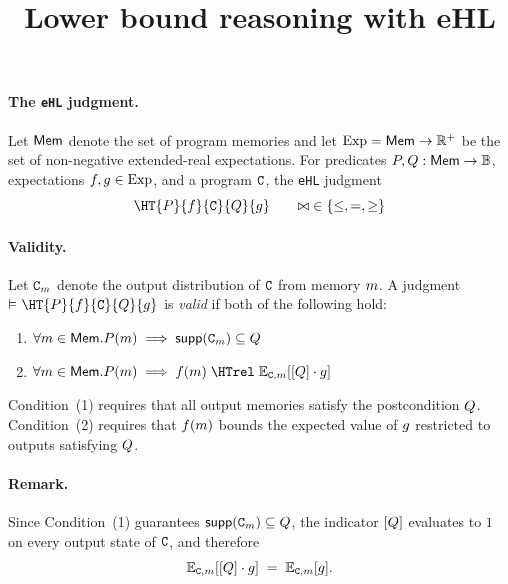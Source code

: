 \documentclass[acmsmall,natbib,review,screen,anonymous,10pt]{acmart}
\newcommand*{\EHL}{\texttt{eHL}\xspace} %
\begin{document}
\newcommand{\todo}[2][red]{{\ttfamily\color{#1}[#2]}}
\newcommand{\ma}[1]{\todo[red]{MA: #1}}

\title{Lower bound reasoning with \textsf{eHL}}

\maketitle

\paragraph{The \EHL judgment.}
Let $\mathsf{Mem}$ denote the set of program memories and let
$\mathrm{Exp} = \mathsf{Mem} \to \mathbb{R}^{+}$ be the set of
non-negative extended-real expectations.
For predicates $P, Q : \mathsf{Mem} \to \mathbb{B}$,
expectations $f, g \in \mathrm{Exp}$, and a program $\mathtt{C}$,
the \EHL judgment
\[
  \HT{\pred}{\ex}{\cmd}{\predtwo}{\extwo}
  \qquad {\rel} \in \{{\leq},=,{\geq}\}
\]

\paragraph{Validity.}
Let $\mathtt{C}_m$ denote the output distribution of $\mathtt{C}$ from memory $m$.
A judgment $\valid \HT{\pred}{\ex}{\cmd}{\predtwo}{\extwo}$ is \emph{valid}
if both of the following hold:
\begin{enumerate}
  \item $\forall m \in \mathsf{Mem} . P(m) \implies \mathsf{supp}(\mathtt{C}_m) \subseteq Q$
  \item $\forall\mem \in \Mem . \pred(\mem) \implies \ex(\mem) \;\HTrel\; \E{\cmd,\mem}{[\predtwo]\cdot\extwo}$
\end{enumerate}
Condition~(1) requires that all output memories satisfy the postcondition
$Q$. Condition~(2) requires that $f(m)$ bounds the expected
value of $g$ restricted to outputs satisfying $Q$.

\paragraph{Remark.}\label{rem:validity-indicator}
Since Condition~(1) guarantees $\mathsf{supp}(\mathtt{C}_m) \subseteq Q$,
the indicator $[Q]$ evaluates to $1$ on every output state of $\mathtt{C}$, and therefore
\[
  \mathbb{E}_{\scriptsize\mathtt{C},m}[[Q]\cdot g] \;=\; \mathbb{E}_{\scriptsize\mathtt{C},m}[g].
\]
\end{document}
